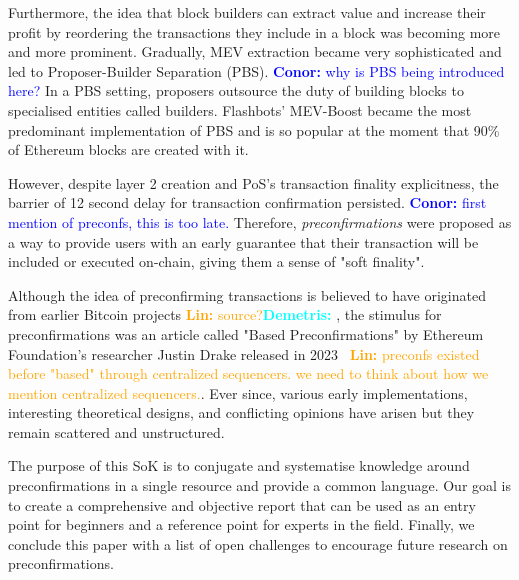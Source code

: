 \documentclass[a4paper]{article}
\theoremstyle{boldstyle}
\newcommand{\cm}[1]{\textcolor{blue}{\textbf{Conor:} #1}}
\newcommand{\lo}[1]{\textcolor{orange}{\textbf{Lin:} #1}}
\newcommand{\dk}[1]{\textcolor{cyan}{\textbf{Demetris:} #1}}
\begin{document}
Furthermore, the idea that block builders can extract value and increase their profit by reordering the transactions they include in a block was becoming more and more prominent. 
Gradually, MEV extraction became very sophisticated and led to Proposer-Builder Separation (PBS). \cm{why is PBS being introduced here?} In a PBS setting, proposers outsource the duty of building blocks to specialised entities called builders. Flashbots' MEV-Boost became the most predominant implementation of PBS and is so popular at the moment that 90\% of Ethereum blocks are created with it.

However, despite layer 2 creation and PoS's transaction finality explicitness, the barrier of 12 second delay for transaction confirmation persisted. 
\cm{first mention of preconfs, this is too late.}
Therefore, \textit{preconfirmations} were proposed as a way to provide users with an early guarantee that their transaction will be included or executed on-chain, giving them a sense of "soft finality".

Although the idea of preconfirming transactions is believed to have originated from earlier Bitcoin projects \lo{source?}\dk{\cite{W:Preconfirmations:Explained}}, the stimulus for preconfirmations was an article called "Based Preconfirmations" by Ethereum Foundation's researcher Justin Drake released in 2023~\cite{W:Basedpreconfirmations} \lo{preconfs existed before "based" through centralized sequencers. we need to think about how we mention centralized sequencers.}. Ever since, various early implementations, interesting theoretical designs, and conflicting opinions have arisen but they remain scattered and unstructured. 

The purpose of this SoK is to conjugate and systematise knowledge around preconfirmations in a single resource and provide a common language. Our goal is to create a comprehensive and objective report that can be used as an entry point for beginners and a reference point for experts in the field. Finally, we conclude this paper with a list of open challenges to encourage future research on preconfirmations.
\end{document}
